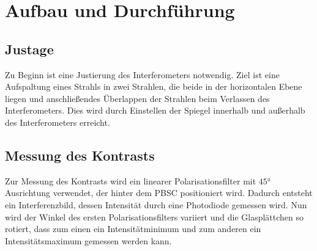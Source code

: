 \newpage
\section{Aufbau und Durchführung}
\label{sec:Durchführung}

\subsection{Justage}
Zu Beginn ist eine Justierung des Interferometers notwendig.
Ziel ist eine Aufspaltung eines Strahls in zwei Strahlen, die beide in
der horizontalen Ebene liegen und anschließendes Überlappen der Strahlen
beim Verlassen des Interferometers. Dies wird durch Einstellen der
Spiegel innerhalb und außerhalb des Interferometers erreicht.


\subsection{Messung des Kontrasts}
Zur Messung des Kontrasts wird ein linearer Polarisationsfilter mit $45\si{\degree}$
Ausrichtung verwendet, der hinter dem PBSC positioniert wird.
Dadurch entsteht ein Interferenzbild, dessen Intensität durch eine Photodiode gemessen wird.
Nun wird der Winkel des ersten Polarisationsfilters variiert
und die Glasplättchen so rotiert, dass zum einen ein Intensitätminimum und zum anderen
ein Intensitätsmaximum gemessen werden kann.

